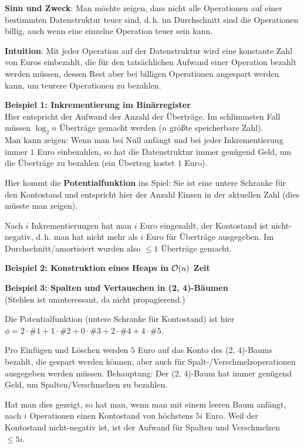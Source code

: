 \textbf{Sinn und Zweck}:
Man möchte zeigen, dass nicht alle Operationen auf einer bestimmten
Datenstruktur teuer sind, d.\,h. im Durchschnitt sind die Operationen billig,
auch wenn eine einzelne Operation teuer sein kann.

\textbf{Intuition}:
Mit jeder Operation auf der Datenstruktur wird eine konstante Zahl von Euros
einbezahlt, die für den tatsächlichen Aufwand einer Operation bezahlt werden
müssen, dessen Rest aber bei billigen Operationen angespart werden kann, um
teurere Operationen zu bezahlen.

\linie

\textbf{Beispiel 1: Inkrementierung im Binärregister} \\
Hier entspricht der Aufwand der Anzahl der Überträge.
Im schlimmsten Fall müssen $\log_2 n$ Überträge gemacht werden
($n$ größte speicherbare Zahl). \\
Man kann zeigen: Wenn man bei Null anfängt und bei jeder Inkrementierung immer
$1$ Euro einbezahlen, so hat die Datenstruktur immer genügend Geld, um
die Überträge zu bezahlen (ein Übertrag kostet $1$ Euro).

Hier kommt die \textbf{Potentialfunktion} ins Spiel:
Sie ist eine untere Schranke für den Kontostand und entspricht hier der
Anzahl Einsen in der aktuellen Zahl
(dies müsste man zeigen).

Nach $i$ Inkrementierungen hat man $i$ Euro eingezahlt, der Kontostand
ist nicht-negativ, d.\,h. man hat nicht mehr als $i$ Euro für Überträge
ausgegeben.
Im Durchschnitt/amortisiert wurden also $\le 1$ Überträge gemacht.

\linie

\textbf{Beispiel 2: Konstruktion eines Heaps in $\mathcal{O}(n)$ Zeit}

\linie

\textbf{Beispiel 3: Spalten und Vertauschen in (2, 4)-Bäumen} \\
(Stehlen ist uninteressant, da nicht propagierend.)

Die Potentialfunktion (untere Schranke für Kontostand) ist hier \\
$\phi = 2 \cdot \#1 + 1 \cdot \#2 + 0 \cdot \#3 + 2 \cdot \#4 + 4 \cdot \#5$.

Pro Einfügen und Löschen werden $5$ Euro auf das Konto des (2, 4)-Baums
bezahlt, die gespart werden können, aber auch für Spalt-/Verschmelzoperationen
ausgegeben werden müssen.
Behauptung: Der (2, 4)-Baum hat immer genügend Geld, um Spalten/Verschmelzen
zu bezahlen.

Hat man dies gezeigt, so hat man, wenn man mit einem leeren Baum anfängt,
nach $i$ Operationen einen Kontostand von höchstens $5i$ Euro.
Weil der Kontostand nicht-negativ ist, ist der Aufwand für Spalten und
Verschmelzen $\le 5i$.

